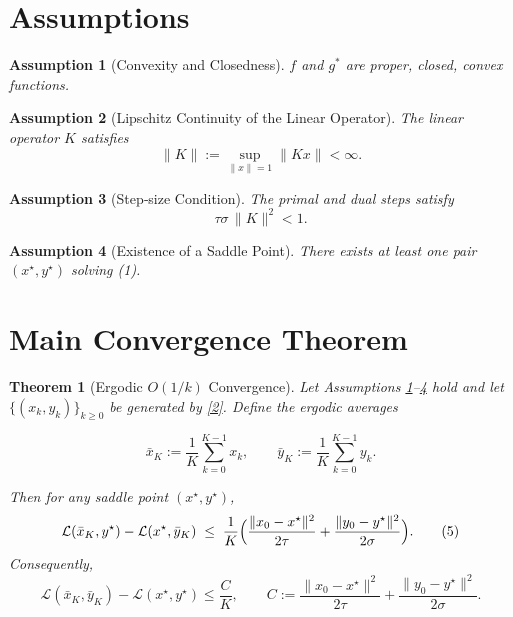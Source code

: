 \documentclass{article}
\newtheorem{theorem}{Theorem}
\newtheorem{assumption}{Assumption}
\begin{document}
\section*{Assumptions}
\begin{assumption}[Convexity and Closedness]\label{ass:convex}
$f$ and $g^{*}$ are proper, closed, convex functions.  
\end{assumption}
\begin{assumption}[Lipschitz Continuity of the Linear Operator]\label{ass:K}
The linear operator $K$ satisfies  
\[
\|K\|:=\sup_{\|x\|=1}\|Kx\| < \infty .
\]
\end{assumption}
\begin{assumption}[Step‑size Condition]\label{ass:steps}
The primal and dual steps satisfy  
\[
\tau\sigma \, \|K\|^{2} < 1 .
\tag{4}
\]
\end{assumption}
\begin{assumption}[Existence of a Saddle Point]\label{ass:saddle}
There exists at least one pair $(x^{\star},y^{\star})$ solving (1).  
\end{assumption}

\section*{Main Convergence Theorem}
\begin{theorem}[Ergodic $O(1/k)$ Convergence]\label{thm:conv}
Let Assumptions \ref{ass:convex}–\ref{ass:saddle} hold and let $\{(x_{k},y_{k})\}_{k\ge 0}$ be generated by \eqref{2}.  
Define the ergodic averages  

\[
\bar x_{K}:=\frac{1}{K}\sum_{k=0}^{K-1} x_{k},
\qquad
\bar y_{K}:=\frac{1}{K}\sum_{k=0}^{K-1} y_{k}.
\]

Then for any saddle point $(x^{\star},y^{\star})$,
\[
\mathcal L(\bar x_{K},y^{\star})-\mathcal L(x^{\star},\bar y_{K})
\;\le\;
\frac{1}{K}\Bigl(
\frac{\|x_{0}-x^{\star}\|^{2}}{2\tau}
+\frac{\|y_{0}-y^{\star}\|^{2}}{2\sigma}
\Bigr).
\tag{5}
\]
Consequently,
\[
\mathcal L(\bar x_{K},\bar y_{K})- \mathcal L(x^{\star},y^{\star})
\le
\frac{C}{K},
\qquad C:=\frac{\|x_{0}-x^{\star}\|^{2}}{2\tau}
+\frac{\|y_{0}-y^{\star}\|^{2}}{2\sigma}.
\tag{6}
\]
\end{theorem}
\end{document}
